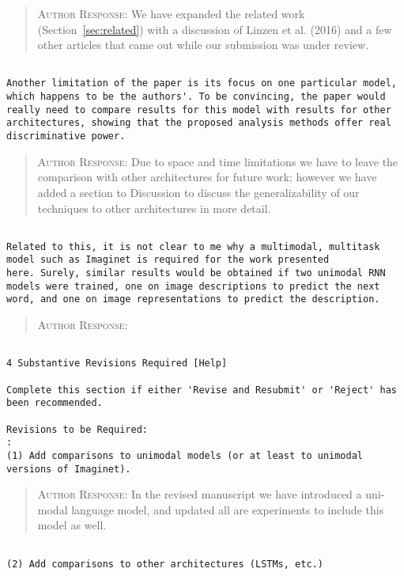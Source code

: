 \begin{quote}
\textsc{Author Response:} We have expanded the related work 
(Section~\ref{sec:related}) with a discussion of Linzen et al. (2016) 
and a few other articles that came out while our submission was under review.
\end{quote}
\begin{verbatim}

Another limitation of the paper is its focus on one particular model,
which happens to be the authors'. To be convincing, the paper would
really need to compare results for this model with results for other
architectures, showing that the proposed analysis methods offer real
discriminative power.
\end{verbatim}  
\begin{quote}
\textsc{Author Response:}  Due to space and time limitations we have to 
leave the comparison with other architectures for future work; however we 
have added a section to Discussion to discuss the generalizability of our 
techniques to other architectures in more detail.
\end{quote}
\begin{verbatim}

Related to this, it is not clear to me why a multimodal, multitask
model such as Imaginet is required for the work presented
here. Surely, similar results would be obtained if two unimodal RNN
models were trained, one on image descriptions to predict the next
word, and one on image representations to predict the description.
\end{verbatim}  
\begin{quote}
\textsc{Author Response:}  
\end{quote}
\begin{verbatim}

4 Substantive Revisions Required [Help]

Complete this section if either 'Revise and Resubmit' or 'Reject' has
been recommended.

Revisions to be Required:
: 
(1) Add comparisons to unimodal models (or at least to unimodal
versions of Imaginet).
\end{verbatim}  
\begin{quote}
\textsc{Author Response:}  In the revised manuscript we have introduced a uni-modal language model, and updated all are experiments to include this model as well.
\end{quote}
\begin{verbatim}

(2) Add comparisons to other architectures (LSTMs, etc.)
\end{verbatim}  
